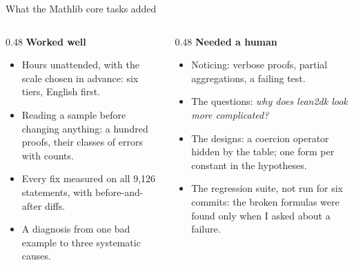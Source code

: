 \documentclass[10pt,aspectratio=169]{beamer}
\newcommand{\bad}[1]{\textcolor{warn}{#1}}
\newcommand{\ok}[1]{\textcolor{good}{#1}}
\begin{document}
\begin{frame}{What the Mathlib core tasks added}
  \begin{columns}[T]
    \begin{column}{0.48\textwidth}
      \ok{\textbf{Worked well}}
      \begin{itemize}\small
        \item Hours unattended, with the scale chosen in advance: six tiers, English first.
        \item Reading a sample before changing anything: a hundred proofs, their classes of
              errors with counts.
        \item Every fix measured on all 9,126 statements, with before-and-after diffs.
        \item A diagnosis from one bad example to three systematic causes.
      \end{itemize}
    \end{column}
    \begin{column}{0.48\textwidth}
      \bad{\textbf{Needed a human}}
      \begin{itemize}\small
        \item Noticing: verbose proofs, partial aggregations, a failing test.
        \item The questions: \emph{why does lean2dk look more complicated?}
        \item The designs: a coercion operator hidden by the table; one form per
              constant in the hypotheses.
        \item The regression suite, \bad{not run for six commits}: the broken formulas
              were found only when I asked about a failure.
      \end{itemize}
    \end{column}
  \end{columns}
\end{frame}
\end{document}
